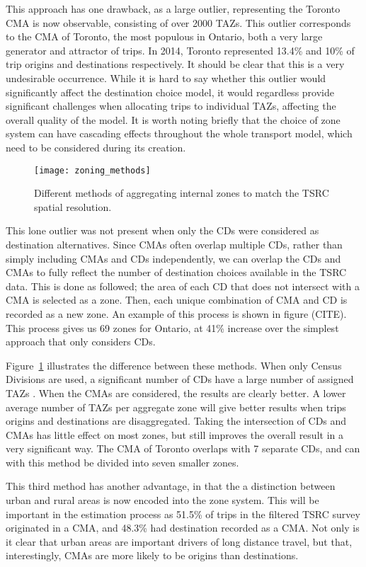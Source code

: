 This approach has one drawback, as a large outlier, representing the Toronto CMA is now observable, consisting of over 2000 TAZs. This outlier corresponds to the CMA of Toronto, the most populous in Ontario, both a very large generator and attractor of trips. In 2014, Toronto represented 13.4\% and 10\% of trip origins and destinations respectively. It should be clear that this is a very undesirable occurrence. While it is hard to say whether this outlier would significantly affect the destination choice model, it would regardless provide significant challenges when allocating trips to individual TAZs, affecting the overall quality of the model. It is worth noting briefly that the choice of zone system can have cascading effects throughout the whole transport model, which need to be considered during its creation.

\begin{figure}[H]
\centering
\texttt{[image: zoning\_methods]}
\caption{Different methods of aggregating internal zones to match the TSRC spatial resolution.}
\label{fig:zoning}
\end{figure}

This lone outlier was not present when only the CDs were considered as destination alternatives. Since CMAs often overlap multiple CDs, rather than simply including CMAs and CDs independently, we can overlap the CDs and CMAs to fully reflect the number of destination choices available in the TSRC data. This is done as followed; the area of each CD that does not intersect with a CMA is selected as a zone. Then, each unique combination of CMA and CD is recorded as a new zone. An example of this process is shown in figure (CITE). This process gives us 69 zones for Ontario, at 41\% increase over the simplest approach that only considers CDs.

Figure~\ref{fig:zoning} illustrates the difference between these methods. When only Census Divisions are used, a significant number of CDs have a large number of assigned TAZs . When the CMAs are considered, the results are clearly better. A lower average number of TAZs per aggregate zone will give better results when trips origins and destinations are disaggregated. Taking the intersection of CDs and CMAs has little effect on most zones, but still improves the overall result in a very significant way. The CMA of Toronto overlaps with 7 separate CDs, and can with this method be divided into seven smaller zones.

This third method has another advantage, in that the a distinction between urban and rural areas is now encoded into the zone system. This will be important in the estimation process as 51.5\% of trips in the filtered TSRC survey originated in a CMA, and 48.3\% had destination recorded as a CMA. Not only is it clear that urban areas are important drivers of long distance travel, but that, interestingly, CMAs are more likely to be origins than destinations.

